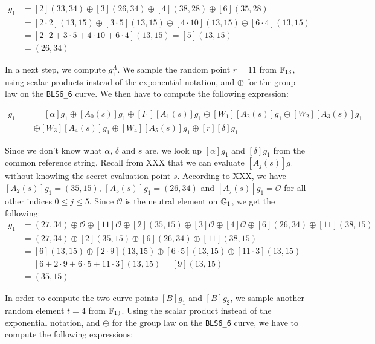 \begin{example}
\begin{align*}
[W]g_1 & = [2](33,34)\oplus [3](26,34)\oplus [4](38,28)\oplus [6](35,28) \\
      & = [2\cdot 2](13,15)\oplus [3\cdot 5](13,15)\oplus [4\cdot 10](13,15)\oplus [6\cdot 4](13,15) \\        
      & = [2\cdot 2+ 3\cdot 5+4\cdot 10+ 6\cdot 4](13,15) = [5](13,15)\\
      & = (26,34)
\end{align*} 

In a next step, we compute $g_1^A$. We sample the random point $r=11$ from $\mathbb{F}_{13}$, using scalar products instead of the exponential notation, and $\oplus$ for the group law on the \texttt{BLS6\_6} curve. We then have to compute the following expression:

\begin{align*}
[A]g_1 = &\phantom{\oplus} [\alpha]g_1 \oplus [A_0(s)]g_1 \oplus [I_1][A_1(s)]g_1\oplus [W_1][A_2(s)]g_1 \oplus [W_2][A_3(s)]g_1\\ 
       & \oplus [W_3][A_4(s)]g_1\oplus [W_4][A_5(s)]g_1\oplus [r][\delta]g_1
\end{align*}

Since we don't know what $\alpha$, $\delta$ and $s$ are, we look up $[\alpha]g_1$ and $[\delta]g_1$ from the common reference string. Recall from XXX that we can evaluate $[A_j(s)]g_1$ without knowling the secret evaluation point $s$. According to XXX, we have $[A_2(s)]g_1=(35,15)$, $[A_5(s)]g_1=(26,34)$ and $[A_j(s)]g_1=\mathcal{O}$ for all other indices $0\leq j\leq 5$. Since $\mathcal{O}$ is the neutral element on $\mathbb{G}_1$, we get the following:
\begin{align*}
[A]g_1 &= (27,34) \oplus \mathcal{O} \oplus [11]\mathcal{O}\oplus [2](35,15) \oplus [3]\mathcal{O} \oplus [4]\mathcal{O}\oplus [6](26,34)\oplus [11](38,15)\\
 &=  (27,34)\oplus [2](35,15)\oplus [6](26,34)\oplus [11](38,15)\\
 &=  [6](13,15)\oplus [2\cdot 9](13,15)\oplus [6\cdot 5](13,15)\oplus [11\cdot 3](13,15)\\ 
 &=  [6+ 2\cdot 9+ 6\cdot 5+ 11\cdot 3](13,15) = [9](13,15)\\
 &= (35,15)
\end{align*}

In order to compute the two curve points $[B]g_1$ and $[B]g_2$, we sample another random element $t=4$ from $\mathbb{F}_{13}$. Using the scalar product instead of the exponential notation, and $\oplus$ for the group law on the \texttt{BLS6\_6} curve, we  have to compute the following expressions:


\end{example}
